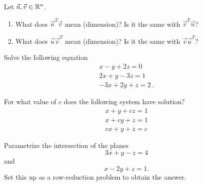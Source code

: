 \documentclass[12pt]{amsart}
\begin{document}
\begin{question}
    Let $\vec{u}, \vec{v} \in \mathbb{R}^n$.
    \begin{enumerate}
        \item What does $\vec{u}^T \vec{v}$ mean (dimension)?
        Is it the same with $\vec{v}^T \vec{u}$?
        \item What does $\vec{u} \vec{v}^T$ mean (dimension)?
        Is it the same with $\vec{v} \vec{u}^T$?
    \end{enumerate}
\end{question}

\begin{question}
    Solve the following equation
    \begin{align*}
        x - y + 2z = 0 \\
        2x + y -3z = 1 \\
        -3x + 2y + z = 2 \,.
    \end{align*}
\end{question}

\begin{question}
    For what value of $c$ does the following system have solution?
    \begin{align*}
        x + y + cz = 1 \\
        x + cy + z = 1 \\
        cx + y + z = c 
    \end{align*}
\end{question}

\begin{question}
    Parametrize the intersection of the planes
    $$ 3x + y -z = 4$$
    and
    $$x - 2y + z = 1. $$
    Set this up as a row-reduction problem to obtain the answer.
\end{question}
\end{document}
